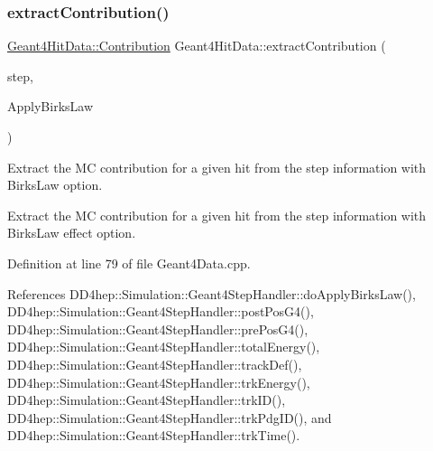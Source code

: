 \hypertarget{class_d_d4hep_1_1_simulation_1_1_geant4_hit_data_a53b06813612ad68f26dc3ad1ca2662b3}{}\label{class_d_d4hep_1_1_simulation_1_1_geant4_hit_data_a53b06813612ad68f26dc3ad1ca2662b3} 
\subsubsection{\texorpdfstring{extract\+Contribution()}{extractContribution()}\hspace{0.1cm}{\footnotesize\ttfamily [2/2]}}
{\footnotesize\ttfamily \hyperlink{class_d_d4hep_1_1_simulation_1_1_geant4_hit_data_aec2f53237eac2db7d83dd03bca8719c5}{Geant4\+Hit\+Data\+::\+Contribution} Geant4\+Hit\+Data\+::extract\+Contribution (\begin{DoxyParamCaption}\item[{const G4\+Step $\ast$}]{step,  }\item[{bool}]{Apply\+Birks\+Law }\end{DoxyParamCaption})\hspace{0.3cm}{\ttfamily [static]}}



Extract the MC contribution for a given hit from the step information with Birks\+Law option. 

Extract the MC contribution for a given hit from the step information with Birks\+Law effect option. 

Definition at line 79 of file Geant4\+Data.\+cpp.



References D\+D4hep\+::\+Simulation\+::\+Geant4\+Step\+Handler\+::do\+Apply\+Birks\+Law(), D\+D4hep\+::\+Simulation\+::\+Geant4\+Step\+Handler\+::post\+Pos\+G4(), D\+D4hep\+::\+Simulation\+::\+Geant4\+Step\+Handler\+::pre\+Pos\+G4(), D\+D4hep\+::\+Simulation\+::\+Geant4\+Step\+Handler\+::total\+Energy(), D\+D4hep\+::\+Simulation\+::\+Geant4\+Step\+Handler\+::track\+Def(), D\+D4hep\+::\+Simulation\+::\+Geant4\+Step\+Handler\+::trk\+Energy(), D\+D4hep\+::\+Simulation\+::\+Geant4\+Step\+Handler\+::trk\+I\+D(), D\+D4hep\+::\+Simulation\+::\+Geant4\+Step\+Handler\+::trk\+Pdg\+I\+D(), and D\+D4hep\+::\+Simulation\+::\+Geant4\+Step\+Handler\+::trk\+Time().



